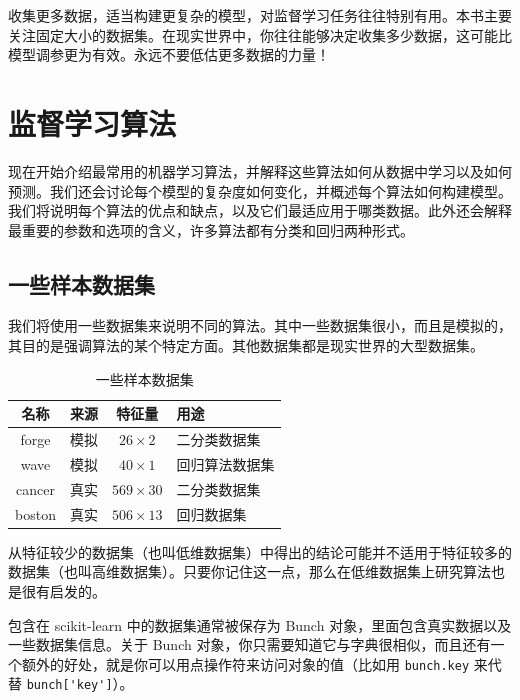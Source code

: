 收集更多数据，适当构建更复杂的模型，对监督学习任务往往特别有用。本书主要关注固定大小的数据集。在现实世界中，你往往能够决定收集多少数据，这可能比模型调参更为有效。永远不要低估更多数据的力量！

\section{监督学习算法}
现在开始介绍最常用的机器学习算法，并解释这些算法如何从数据中学习以及如何预测。我们还会讨论每个模型的复杂度如何变化，并概述每个算法如何构建模型。我们将说明每个算法的优点和缺点，以及它们最适应用于哪类数据。此外还会解释最重要的参数和选项的含义，许多算法都有分类和回归两种形式。

\subsection{一些样本数据集}
我们将使用一些数据集来说明不同的算法。其中一些数据集很小，而且是模拟的，其目的是强调算法的某个特定方面。其他数据集都是现实世界的大型数据集。

\begin{table}
    \centering
    \caption{一些样本数据集}
    \begin{tabular}{cccl}
        \hline
        名称     & 来源 & 特征量            & 用途      \\
        \hline
        forge  & 模拟 & $26\times 2$   & 二分类数据集  \\
        wave   & 模拟 & $40\times 1$   & 回归算法数据集 \\
        cancer & 真实 & $569\times 30$ & 二分类数据集  \\
        boston & 真实 & $506\times 13$ & 回归数据集   \\
        \hline
    \end{tabular}
\end{table}


从特征较少的数据集（也叫低维数据集）中得出的结论可能并不适用于特征较多的数据集（也叫高维数据集）。只要你记住这一点，那么在低维数据集上研究算法也是很有启发的。

\begin{tcolorbox}[breakable]
    包含在 scikit-learn 中的数据集通常被保存为 Bunch 对象，里面包含真实数据以及一些数据集信息。关于 Bunch 对象，你只需要知道它与字典很相似，而且还有一个额外的好处，就是你可以用点操作符来访问对象的值（比如用 \verb|bunch.key| 来代替 \verb|bunch['key']|）。
\end{tcolorbox}

